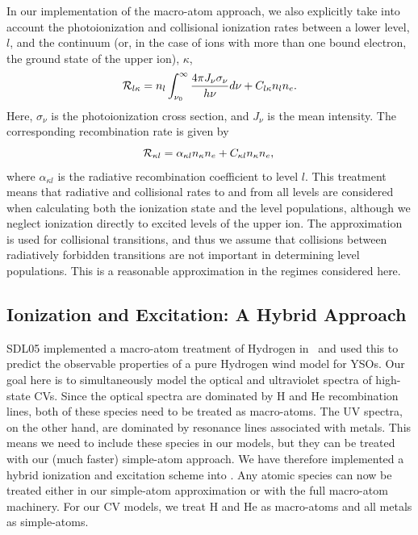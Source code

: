 \documentclass[preprint, a4paper, 11pt]{aastex}
\begin{document}
In our implementation of the macro-atom approach, we also explicitly
take into account the photoionization and collisional ionization rates
between a lower level, $l$, and the continuum (or, in the case of ions
with more than one bound electron, the ground state of the upper ion),
$\kappa$,
\begin{equation}
{\cal R}_{l \kappa}= n_l \int_{\nu_0}^{\infty} \frac{ 4 \pi J_{\nu}
  \sigma_{\nu}}{h \nu} d\nu + C_{l \kappa} n_l n_e.
\end{equation}
Here, $\sigma_{\nu}$ is the photoionization cross section, and $J_{\nu}$
is the mean intensity. The corresponding recombination rate is given
by 
\begin{equation}
{\cal R}_{\kappa l} = \alpha_{\kappa l} n_{\kappa} n_e + C_{\kappa l}
n_\kappa n_e, \\
\end{equation}
where $\alpha_{\kappa l}$ is the radiative recombination coefficient
to level $l$. This treatment means that radiative and collisional
rates to and from all levels are considered when calculating both the
ionization state and the level populations, although we neglect 
ionization directly to excited levels of the upper ion. The
\cite{vanregemorter} approximation is used for collisional
transitions, and thus we assume that collisions between radiatively
forbidden transitions are not important in determining level
populations. This is a reasonable approximation in the regimes
considered here.

\subsection{Ionization and Excitation: A Hybrid Approach}

SDL05 implemented a macro-atom treatment of Hydrogen in \py\ and used
this to predict the observable properties of a pure Hydrogen wind
model for YSOs. Our goal here is to simultaneously model the optical
and ultraviolet spectra of high-state CVs. Since the optical spectra
are dominated by H and He recombination lines, both of these species
need to be treated as macro-atoms. The UV spectra, on the other hand,
are dominated by resonance lines associated with metals. This means we
need to include these species in our models, but they can be treated 
with our (much faster) simple-atom approach. We have therefore
implemented a hybrid ionization and excitation scheme into \py. Any
atomic species can now be treated either in our simple-atom
approximation or with the full macro-atom machinery. For our CV
models, we treat H and He as macro-atoms and all metals as
simple-atoms.  
\end{document}
